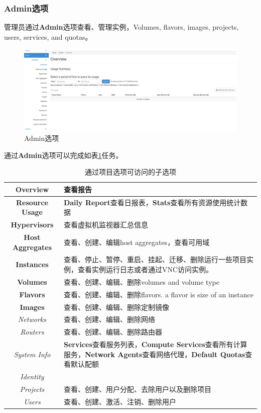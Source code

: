 \documentclass[12pt]{article}
\begin{document}
\subsubsection{\textbf{Admin}选项}
管理员通过\textbf{Admin}选项查看、管理实例，Volumes, flavors, images, projects, users, services, and quotas。
\begin{figure}[!htb]
\centering
\includegraphics[width=6in]{./figures/adminOverview}
\caption{Admin选项}
\label{fig:adminOverview}
\end{figure}
通过\textbf{Admin}选项可以完成如表\ref{tab:admin}任务。
\begin{table}[!htb]
\centering
\caption{通过项目选项可访问的子选项}  \label{tab:admin}
\begin{tabular}{c|p{8cm}} \hline
\textbf{Overview}& 查看报告\\ \hline
\textbf{Resource Usage} & \textbf{Daily Report}查看日报表，\textbf{Stats}查看所有资源使用统计数据\\ \hline
\textbf{Hypervisors} & 查看虚拟机监视器汇总信息\\ \hline
\textbf{Host Aggregates} & 查看、创建、编辑host aggregates，查看可用域 \\ \hline
\textbf{Instances} & 查看、停止、暂停、重启、挂起、迁移、删除运行一些项目实例，查看实例运行日志或者通过VNC访问实例。 \\ \hline
\textbf{Volumes} & 查看、创建、编辑、删除volumes and volume type\\ \hline
\textbf{Flavors} & 查看、创建、编辑、删除flavors. a flavor is size of an instance \\ \hline
\textbf{Images} & 查看、创建、编辑、删除定制镜像 \\ \hline
\textit{Networks} & 查看、创建、编辑、删除网络 \\ \hline
\textit{Routers} & 查看、创建、编辑、删除路由器 \\

\textit{System Info}& \textbf{Services}查看服务列表，\textbf{Compute Services}查看所有计算服务，\textbf{Network Agents}查看网络代理，\textbf{Default Quotas}查看默认配额\\ \hline
\textit{Identity} &  \\ \hline
\textit{Projects} & 查看、创建、用户分配、去除用户以及删除项目 \\
\textit{Users}& 查看、创建、激活、注销、删除用户 \\ \hline
\end{tabular}
\end{table}
\end{document}
